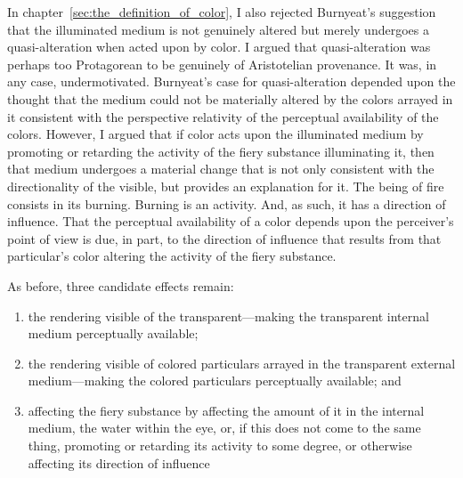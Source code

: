 In chapter~\ref{sec:the_definition_of_color}, I also rejected Burnyeat's suggestion that the illuminated medium is not genuinely altered but merely undergoes a quasi-alteration when acted upon by color. I argued that quasi-alteration was perhaps too Protagorean to be genuinely of Aristotelian provenance. It was, in any case, undermotivated. Burnyeat's case for quasi-alteration depended upon the thought that the medium could not be materially altered by the colors arrayed in it consistent with the perspective relativity of the perceptual availability of the colors. However, I argued that if color acts upon the illuminated medium by promoting or retarding the activity of the fiery substance illuminating it, then that medium undergoes a material change that is not only consistent with the directionality of the visible, but provides an explanation for it. The being of fire consists in its burning. Burning is an activity. And, as such, it has a direction of influence. That the perceptual availability of a color depends upon the perceiver’s point of view is due, in part, to the direction of influence that results from that particular’s color altering the activity of the fiery substance.

As before, three candidate effects remain:
\begin{enumerate}[(1)]
	\item the rendering visible of the transparent---making the transparent internal me\-di\-um perceptually available;
	\item the rendering visible of colored particulars arrayed in the transparent external me\-di\-um\----making the colored particulars perceptually available; and
	\item affecting the fiery substance by affecting the amount of it in the internal me\-di\-um, the water within the eye, or, if this does not come to the same thing, promoting or retarding its activity to some degree, or otherwise affecting its direction of influence
\end{enumerate}

